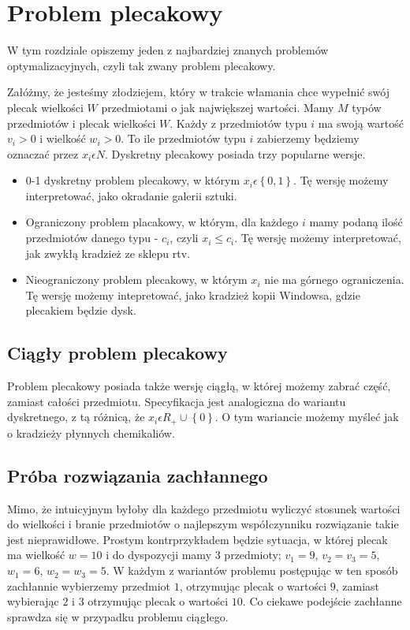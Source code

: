 \section{Problem plecakowy}

\label{sec:plecaki}

W tym rozdziale opiszemy jeden z najbardziej znanych problemów optymalizacyjnych, czyli tak zwany problem plecakowy.

Załóżmy, że jesteśmy złodziejem, który w trakcie włamania chce wypełnić swój plecak wielkości $W$ przedmiotami o jak największej wartości.
Mamy $M$ typów przedmiotów i plecak wielkości $W$.
Każdy z przedmiotów typu $i$ ma swoją wartość $v_i> 0$ i wielkość $w_i> 0$.
To ile przedmiotów typu $i$ zabierzemy będziemy oznaczać przez $x_i\epsilon N$.
Dyskretny plecakowy posiada trzy popularne wersje.


\begin{itemize}
  \item 0-1 dyskretny problem plecakowy, w którym $x_i \epsilon \left \{ 0, 1 \right \}$.
  Tę wersję możemy interpretować, jako okradanie galerii sztuki.
  \item Ograniczony problem placakowy, w którym, dla każdego $i$ mamy podaną ilość przedmiotów danego typu - $c_i$, czyli $x_i \leq c_i$.
  Tę wersję możemy interpretować, jak zwykłą kradzież ze sklepu rtv.
  \item Nieograniczony problem plecakowy, w którym $x_i$ nie ma górnego ograniczenia.
  Tę wersję możemy intepretować, jako kradzież kopii Windowsa, gdzie plecakiem będzie dysk.
\end{itemize}

\subsection{Ciągły problem plecakowy}
Problem plecakowy posiada także wersję ciągłą, w której możemy zabrać część, zamiast całości przedmiotu.
Specyfikacja jest analogiczna do wariantu dyskretnego, z tą różnicą, że $x_i \epsilon R_+ \cup \left \{ 0 \right \}$.
O tym wariancie możemy myśleć jak o kradzieży płynnych chemikaliów.

\subsection{Próba rozwiązania zachłannego}
Mimo, że intuicyjnym byłoby dla każdego przedmiotu wyliczyć stosunek wartości do wielkości i branie przedmiotów
o najlepszym współczynniku rozwiązanie takie jest nieprawidłowe.
Prostym kontrprzykładem będzie sytuacja, w której plecak ma wielkość $w = 10$ i do dyspozycji mamy $3$ przedmioty;
$v_1=9$, $v_2=v_3=5$, $w_1=6$, $w_2=w_3=5$. W każdym z wariantów problemu postępując w ten sposób zachłannie wybierzemy przedmiot $1$,
otrzymując plecak o wartości $9$, zamiast wybierając $2$ i $3$ otrzymując plecak o wartości $10$.
Co ciekawe podejście zachłanne sprawdza się w przypadku problemu ciągłego.


